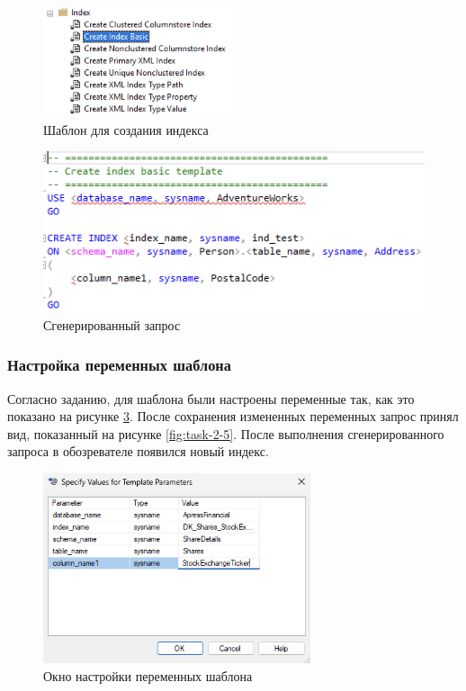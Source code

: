 \documentclass[a4paper, 14pt]{extarticle}
\begin{document}
\begin{figure}[H]
  \centering
  \includegraphics[width=0.5\textwidth]{images/task-2/2.png}
  \caption{Шаблон для создания индекса}
  \label{fig:task-2-2}
\end{figure}

\begin{figure}[H]
  \centering
  \includegraphics[width=\textwidth]{images/task-2/3.png}
  \caption{Сгенерированный запрос}
  \label{fig:task-2-3}
\end{figure}

\subsubsection{Настройка переменных шаблона}

Согласно заданию, для шаблона были настроены переменные так, как это показано на
рисунке \ref{fig:task-2-4}. После сохранения измененных переменных запрос принял
вид, показанный на рисунке \ref{fig:task-2-5}. После выполнения сгенерированного
запроса в обозревателе появился новый индекс.

\begin{figure}[H]
  \centering
  \includegraphics[width=0.7\textwidth]{images/task-2/4.png}
  \caption{Окно настройки переменных шаблона}
  \label{fig:task-2-4}
\end{figure}
\end{document}
